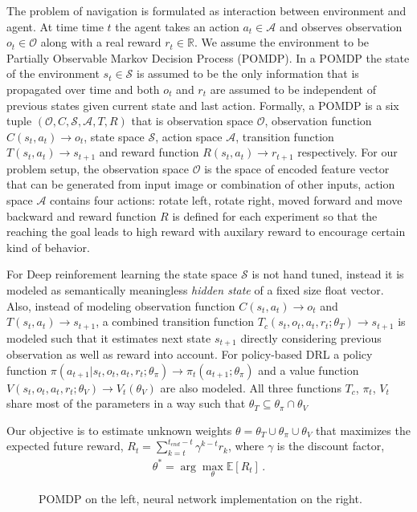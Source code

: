 \documentclass[letterpaper]{article} %
\def\state{s}
\def\statet{\state_t}
\def\statetn{\state_{t+1}}
\def\obs{o}
\def\obst{\obs_t}
\def\act{a}
\def\actt{\act_t}
\def\acttn{\act_{t+1}}
\def\Obs{\mathcal{O}}
\def\ObsFunc{C}
\def\ObsFuncFull{\ObsFunc(\statet, \actt) \rightarrow \obst}
\def\ObsFuncInv{\ObsFunc^{-1}}
\def\State{\mathcal{S}}
\def\Action{\mathcal{A}}
\def\Trans{T}
\def\TransFull{\Trans(\statet, \actt) \rightarrow \statetn}
\def\TransObs{T_c}
\def\Rew{R}
\def\rew{r}
\def\rewt{\rew_t}
\def\rewtn{\rew_{t+1}}
\def\RewFull{\Rew(\statet, \actt) \rightarrow \rewtn}
\def\TransObsFull{\TransObs(\statet, \obst, \actt, \rewt; \theta_T) \rightarrow \statetn}
\def\Value{V}
\def\pit{\pi_t}
\def\piDef{\pi(\acttn|\statet, \obst, \actt, \rewt; \theta_\pi) \rightarrow \pit(\acttn ; \theta_\pi)}
\def\Valuet{\Value_t}
\def\ValueDef{\Value(\statet, \obst, \actt, \rewt; \theta_\Value) \rightarrow \Valuet(\theta_\Value)}
\def\R{\mathbb{R}}
\def\E{\mathbb{E}}
\begin{document}
The problem of navigation is formulated as interaction between environment and agent. At time time $t$ the agent takes an action $\actt \in \Action$ and observes observation $\obst \in \Obs$ along with a real reward $\rewt \in \R$.
We assume the environment to be Partially Observable Markov Decision Process (POMDP).
In a POMDP the state of the environment $\statet \in \State$ is assumed to be the only information that is propagated over time and both $\obst$ and $\rewt$ are assumed to be independent of previous states given current state and last action. Formally, a POMDP is a six tuple $(\Obs, \ObsFunc, \State, \Action, \Trans, \Rew)$ that is observation space $\Obs$, observation function $\ObsFuncFull$, state space $\State$, action space $\Action$, transition function $\TransFull$ and reward function $\RewFull$ respectively.
For our problem setup, the observation space $\Obs$ is the space of encoded feature vector that can be generated from input image or combination of other inputs, action space $\Action$ contains four actions: rotate left, rotate right, moved forward and move backward and reward function $\Rew$ is defined for each experiment so that the reaching the goal leads to high reward with auxilary reward to encourage certain kind of behavior.

For Deep reinforement learning the state space $\State$ is not hand tuned, instead it is modeled as semantically meaningless \emph{hidden state} of a fixed size float vector.
Also, instead of modeling observation function $\ObsFuncFull$ and $\TransFull$, a combined transition function $\TransObsFull$ is modeled such that it estimates next state $\statetn$ directly considering previous observation as well as reward into account. For policy-based DRL a policy function $\piDef$ and a value function $\ValueDef$ are also modeled. All three functions $\TransObs$, $\pit$, $\Valuet$ share most of the parameters in a way such that $\theta_T \subseteq \theta_{\pi} \cap \theta_\Value$

Our objective is to estimate unknown weights $\theta = \theta_T \cup \theta_\pi \cup \theta_V$ that maximizes the expected future reward, $R_t = \sum_{k=t}^{t_{end} - t} \gamma^{k-t} r_k$, where $\gamma$ is the discount factor,
%
\begin{align}
\theta^* = \arg\max_{\theta} \E[R_t] \,.
\end{align}
%
\def\svgwidth{0.5\columnwidth}%
\begin{figure}%
%
\def\svgwidth{0.5\columnwidth}%

\caption{POMDP on the left, neural network implementation on the right.}
\end{figure}
\end{document}
